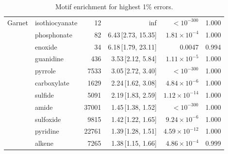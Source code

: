 \begin{table}[t]
\begin{tabular}{llrrrr}
    \hline
    Garnet & isothiocyanate & 12 & inf & $< 10^{-300}$ & 1.000 \\
      & phosphonate & 82 & 6.43\,[2.73, 15.35] & $1.81\times 10^{-4}$ & 1.000 \\
      & enoxide & 34 & 6.18\,[1.79, 23.11] & 0.0047 & 0.994 \\
      & guanidine & 436 & 3.53\,[2.12, 5.84] & $1.11\times 10^{-5}$ & 1.000 \\
      & pyrrole & 7533 & 3.05\,[2.72, 3.40] & $< 10^{-300}$ & 1.000 \\
      & carboxylate & 1629 & 2.24\,[1.62, 3.08] & $4.84\times 10^{-6}$ & 1.000 \\
      & sulfide & 5091 & 2.19\,[1.83, 2.59] & $1.12\times 10^{-14}$ & 1.000 \\
      & amide & 37001 & 1.45\,[1.38, 1.52] & $< 10^{-300}$ & 1.000 \\
      & sulfoxide & 9815 & 1.42\,[1.22, 1.65] & $9.24\times 10^{-6}$ & 1.000 \\
      & pyridine & 22761 & 1.39\,[1.28, 1.51] & $4.59\times 10^{-12}$ & 1.000 \\
      & alkene & 7265 & 1.38\,[1.15, 1.66] & $4.86\times 10^{-4}$ & 0.999 \\
    \hline
  \end{tabular}
  \caption{Motif enrichment for highest 1\% errors.}
  \label{tab:split_angles_worst}
\end{table}